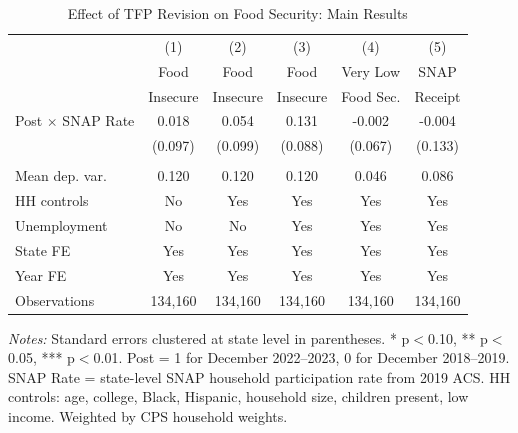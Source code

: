 \begin{table}[H]
\centering
\caption{Effect of TFP Revision on Food Security: Main Results}
\label{tab:main}
\begin{threeparttable}
\begin{tabular}{lccccc}
\toprule
& (1) & (2) & (3) & (4) & (5) \\
& Food & Food & Food & Very Low & SNAP \\
& Insecure & Insecure & Insecure & Food Sec. & Receipt \\
\midrule
Post $\times$ SNAP Rate & 0.018 & 0.054 & 0.131 & -0.002 & -0.004 \\
& (0.097) & (0.099) & (0.088) & (0.067) & (0.133) \\
\\
Mean dep. var. & 0.120 & 0.120 & 0.120 & 0.046 & 0.086 \\
HH controls & No & Yes & Yes & Yes & Yes \\
Unemployment & No & No & Yes & Yes & Yes \\
State FE & Yes & Yes & Yes & Yes & Yes \\
Year FE & Yes & Yes & Yes & Yes & Yes \\
Observations & 134,160 & 134,160 & 134,160 & 134,160 & 134,160 \\
\bottomrule
\end{tabular}
\begin{tablenotes}[flushleft]
\small
\item \textit{Notes:} Standard errors clustered at state level in parentheses. * p$<$0.10, ** p$<$0.05, *** p$<$0.01. Post = 1 for December 2022--2023, 0 for December 2018--2019. SNAP Rate = state-level SNAP household participation rate from 2019 ACS. HH controls: age, college, Black, Hispanic, household size, children present, low income. Weighted by CPS household weights.
\end{tablenotes}
\end{threeparttable}
\end{table}

